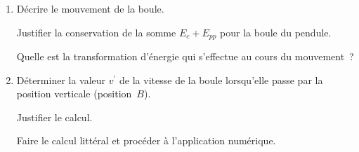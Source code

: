 \begin{enumerate}
    \item Décrire le mouvement de la boule.

          Justifier la conservation de la somme $E_{c}+E_{pp}$ pour la boule du
          pendule.
    
          Quelle est la transformation d'énergie qui s'effectue au cours du
          mouvement~?
    \item Déterminer la valeur $v^{\prime}$ de la vitesse de la boule
          lorsqu'elle passe par la position verticale (position~$B$).
    
          Justifier le calcul.
    
          Faire le calcul littéral et procéder à l'application numérique.
\end{enumerate}
